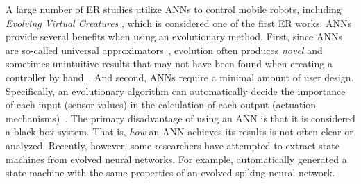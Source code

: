 A large number of ER studies utilize ANNs to control mobile robots, including \emph{Evolving Virtual Creatures} \citep{Sims.1994.AL.Evolving3DMorphology}, which is considered one of the first ER works.
%
ANNs  provide several benefits when using an evolutionary method.
%
First, since ANNs are so-called universal approximators~\citep{Hornik.1989.NN.UniversalANN}, evolution often produces \emph{novel} and sometimes unintuitive results that may not have been found when creating a controller by hand~\citep{Bongard.2013.CACM.ER}.
%
And second, ANNs require a minimal amount of user design. Specifically, an evolutionary algorithm can automatically decide the importance of each input (sensor values) in the calculation of each output (actuation mechanisms)~\citep{Stanley.2002.EC.NEAT}.
%
The primary disadvantage of using an ANN is that it is considered a black-box system. That is, \emph{how} an ANN achieves its results is not often clear or analyzed.
%
Recently, however, some researchers have attempted to extract state machines from evolved neural networks.
%
For example, \citet{Wrobel.2017.SSCI.VSSNN} automatically generated a state machine with the same properties of an evolved spiking neural network.
